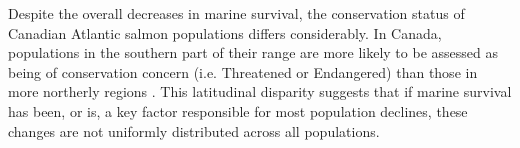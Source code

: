 \documentclass[12pt]{article}
\begin{document}


Despite the overall decreases in marine survival,
the conservation status of Canadian Atlantic salmon populations differs
considerably. In Canada, populations in the southern part of their range are more
likely to be assessed as being of conservation concern (i.e. Threatened or Endangered)
than those in more
northerly regions \citep{Cosewic2010}. This latitudinal disparity
suggests that if marine survival has been, or is, a key factor responsible for
most population declines, these changes are not uniformly distributed across
all populations.


\end{document}
